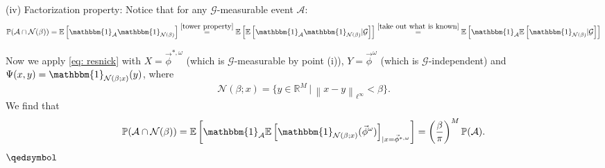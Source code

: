 \documentclass[a4paper,10pt,reqno]{article}
\theoremstyle{definition}
\theoremstyle{plain}
\theoremstyle{plain}
\theoremstyle{definition}
\theoremstyle{plain}
\theoremstyle{plain}
\theoremstyle{plain}
\theoremstyle{definition}
\theoremstyle{definition}
\newcommand{\norm}[1]{\left\lVert #1 \right\rVert}
\def \R{\mathbb R}
\def \P{{\mathbb P}}
\def \T{\mathbb{T}}
\def \E{\mathbb{E}}
\def \A{\mathcal{A}}
\begin{document}
\medskip

\noindent (iv) {\sc Factorization property:} Notice that for any $\mathcal{G}$-measurable event $\A$:
\[
\P (\A \cap \mathcal{N}(\beta) ) = \E \left [ \mathbbm{1}_{\A} \mathbbm{1}_{\mathcal{N}(\beta)} \right ] \stackrel{\eqref{tower property}}{=} \E \left [ \E \left [ \mathbbm{1}_{\A} \mathbbm{1}_{\mathcal{N}(\beta)} \lvert \mathcal{G} \right ] \right ] \stackrel{\eqref{take out what is known}}{=} \E \left [ \mathbbm{1}_{\A} \E \left [  \mathbbm{1}_{\mathcal{N}(\beta)} \lvert \mathcal{G} \right ] \right ]
\]

Now we apply \eqref{eq: resnick} with $X = \vec{\phi}^{*,\omega}$ (which is $\mathcal{G}$-measurable by point (i)), $Y = \vec{\phi}^{\omega}$ (which is $\mathcal{G}$-independent) and $\Psi(x,y) = \mathbbm{1}_{\mathcal{N}(\beta ; x)}(y)$, where
\[
\mathcal{N}(\beta ; x) = \{ y \in \R^M \, \lvert \, \norm{x-y}_{\ell^{\infty}} < \beta \}.
\]
We find that
\[
\P (\A \cap \mathcal{N}(\beta) ) = \E \left [ \mathbbm{1}_{\A} \E \left [  \mathbbm{1}_{\mathcal{N}(\beta ; x)}(\vec{\phi}^{\omega}) \right ]_{\lvert x = \vec{\phi}^{*,\omega}} \right ] = \left ( \frac{\beta}{\pi} \right )^M \P (\A).
\]
$\hfill \qedsymbol$

\end{document}
